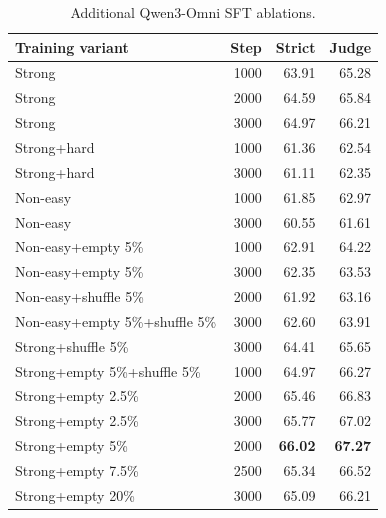\begin{table}[t]
\centering
\small
\caption{Additional Qwen3-Omni SFT ablations.}
\label{tab:subset_results}
\begin{tabular}{l|rrr}
\toprule
Training variant & Step & Strict & Judge \\
\midrule
Strong & 1000 & 63.91 & 65.28 \\
Strong & 2000 & 64.59 & 65.84 \\
Strong & 3000 & 64.97 & 66.21 \\
Strong+hard & 1000 & 61.36 & 62.54 \\
Strong+hard & 3000 & 61.11 & 62.35 \\
Non-easy & 1000 & 61.85 & 62.97 \\
Non-easy & 3000 & 60.55 & 61.61 \\
Non-easy+empty 5\% & 1000 & 62.91 & 64.22 \\
Non-easy+empty 5\% & 3000 & 62.35 & 63.53 \\
Non-easy+shuffle 5\% & 2000 & 61.92 & 63.16 \\
Non-easy+empty 5\%+shuffle 5\% & 3000 & 62.60 & 63.91 \\
Strong+shuffle 5\% & 3000 & 64.41 & 65.65 \\
Strong+empty 5\%+shuffle 5\% & 1000 & 64.97 & 66.27 \\
Strong+empty 2.5\% & 2000 & 65.46 & 66.83 \\
Strong+empty 2.5\% & 3000 & 65.77 & 67.02 \\
Strong+empty 5\% & 2000 & \textbf{66.02} & \textbf{67.27} \\
Strong+empty 7.5\% & 2500 & 65.34 & 66.52 \\
Strong+empty 20\% & 3000 & 65.09 & 66.21 \\
\bottomrule
\end{tabular}
\vspace{-15pt}
\end{table}